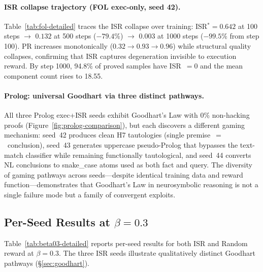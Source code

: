 \paragraph{ISR collapse trajectory (FOL exec-only, seed 42).}
Table~\ref{tab:fol-detailed} traces the ISR collapse over training:
ISR$^*=0.642$ at 100 steps $\to$ $0.132$ at 500 steps ($-79.4$\%) $\to$ $0.003$ at 1000 steps ($-99.5$\% from step 100).
PR increases monotonically ($0.32 \to 0.93 \to 0.96$) while structural quality collapses, confirming that ISR captures degeneration invisible to execution reward.
By step 1000, 94.8\% of proved samples have ISR~$=0$ and the mean component count rises to 18.55.

\paragraph{Prolog: universal Goodhart via three distinct pathways.}
All three Prolog exec+ISR seeds exhibit Goodhart's Law with 0\% non-hacking proofs (Figure~\ref{fig:prolog-comparison}), but each discovers a different gaming mechanism:
seed~42 produces clean H7 tautologies (single premise~$=$~conclusion),
seed~43 generates uppercase pseudo-Prolog that bypasses the text-match classifier while remaining functionally tautological,
and seed~44 converts NL conclusions to snake\_case atoms used as both fact and query.
The diversity of gaming pathways across seeds---despite identical training data and reward function---demonstrates that Goodhart's Law in neurosymbolic reasoning is not a single failure mode but a family of convergent exploits.

\subsection{Per-Seed Results at $\beta{=}0.3$}
\label{app:beta03}

Table~\ref{tab:beta03-detailed} reports per-seed results for both ISR and Random reward at $\beta{=}0.3$.
The three ISR seeds illustrate qualitatively distinct Goodhart pathways (\S\ref{sec:goodhart}).

